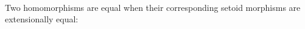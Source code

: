 \begin{code}
\>[0]\AgdaSpace{}%
\AgdaSymbol{:}\AgdaSpace{}%
\AgdaSymbol{(}\AgdaSpace{}\AgdaSpace{}\AgdaSymbol{:}\AgdaSpace{}
\AgdaSymbol{)}\AgdaSpace{}
\AgdaSpace{}\AgdaSpace{}\<%
\\
%
\>[0]\AgdaSpace{}%
\AgdaSpace{}%
%
\>[8]\AgdaSymbol{=}\AgdaSpace{}%
\AgdaSpace{}%
\AgdaSymbol{(}\AgdaSpace{}%
\AgdaSymbol{:}\AgdaSpace{}%
\AgdaSpace{}%
\AgdaSpace{}%
\AgdaSymbol{)}\AgdaSpace{}%
\AgdaSpace{}%
\AgdaSymbol{(}\AgdaSpace{}%
\AgdaSpace{}%
\AgdaSymbol{)}\AgdaSpace{}%
\AgdaSpace{}%
\AgdaSymbol{(}\AgdaSpace{}%
\AgdaSpace{}%
\AgdaSymbol{)}\<%
\end{code}


\noindent Two homomorphisms are equal when their corresponding setoid
morphisms are extensionally equal:


\begin{code}
\>[2]%
\>[8]\AgdaSymbol{:}\AgdaSpace{}%
\AgdaSpace{}%
\AgdaSymbol{\{}\AgdaSymbol{\}}\AgdaSpace{}%
\AgdaSymbol{\{}\AgdaSpace{}\AgdaSymbol{\}}\AgdaSpace{}%
\AgdaSpace{}%
\AgdaSymbol{(}\AgdaSpace{}%
\AgdaSpace{}%
\AgdaSymbol{:}\AgdaSpace{}%
\AgdaSpace{}\AgdaSpace{}\AgdaSymbol{)}\AgdaSpace{}%
\AgdaSpace{}%
\AgdaSpace{}%
\AgdaSymbol{\AgdaUnderscore{}}\<%
\\
%
\>[2]\AgdaSpace{}%
\AgdaSpace{}%
\AgdaSpace{}%
\AgdaSymbol{=}\AgdaSpace{}%
\AgdaSymbol{(}\AgdaSpace{}%
\AgdaSymbol{:}\AgdaSpace{}%
\AgdaSpace{}%
\AgdaSymbol{)}\AgdaSpace{}%
\AgdaSpace{}%
\AgdaSymbol{(}\AgdaSpace{}%
\AgdaSpace{}%
\AgdaSpace{}%
\AgdaSymbol{)}\AgdaSpace{}%
\AgdaSpace{}%
\AgdaSymbol{(}\AgdaSpace{}%
\AgdaSpace{}%
\AgdaSpace{}%
\AgdaSymbol{)}\<%
\end{code}


